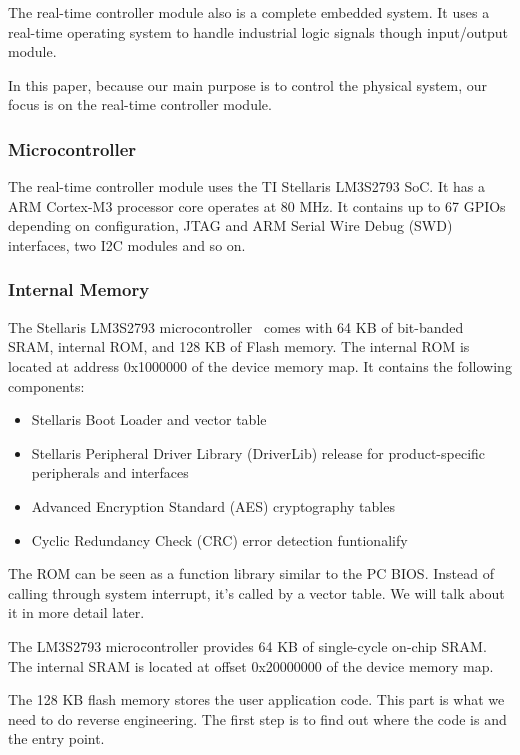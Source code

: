 The real-time controller module also is a complete embedded system. It uses a real-time operating system to handle industrial logic signals though input/output module.

In this paper, because our main purpose is to control the physical system, our focus is on the real-time controller module.


\subsubsection{Microcontroller}

The real-time controller module uses the TI Stellaris LM3S2793 SoC. It has a ARM Cortex-M3 processor core operates at 80 MHz. It contains up to 67 GPIOs depending on configuration, JTAG and ARM Serial Wire Debug (SWD) interfaces, two I2C modules and so on.

\subsubsection{Internal Memory}The Stellaris LM3S2793 microcontroller~\cite{lm3s2793} comes with 64 KB of bit-banded SRAM, internal ROM, and 128 KB of Flash memory. The internal ROM is located at address 0x1000000 of the device memory map. It contains the following components:

\begin{itemize}
	\item Stellaris Boot Loader and vector table
	\item Stellaris Peripheral Driver Library (DriverLib) release for product-specific peripherals and interfaces
	\item Advanced Encryption Standard (AES) cryptography tables
	\item Cyclic Redundancy Check (CRC) error detection funtionalify
\end{itemize}

The ROM can be seen as a function library similar to the PC BIOS. Instead of calling through system interrupt, it's called by a vector table. We will talk about it in more detail later.

The LM3S2793 microcontroller provides 64 KB of single-cycle on-chip SRAM. The internal SRAM is located at offset 0x20000000 of the device memory map.

The 128 KB flash memory stores the user application code. This part is what we need to do reverse engineering. The first step is to find out where the code is and the entry point.

